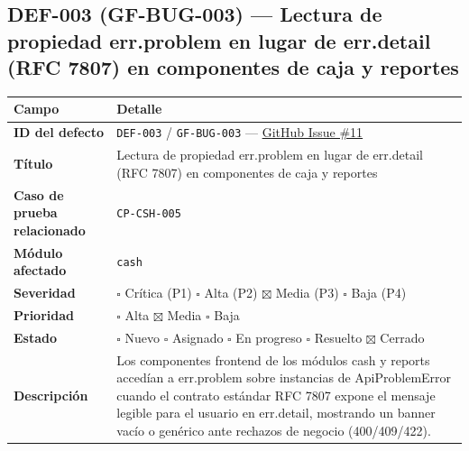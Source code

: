 \documentclass[10pt,a4paper]{article}
\newcounter{none}
\begin{document}
\endgroup\medskip


\subsection{DEF-003 (GF-BUG-003) --- Lectura de propiedad err.problem en lugar de err.detail (RFC 7807) en componentes de caja y reportes}\label{def-003-gf-bug-003--lectura-de-propiedad-errproblem-en-lugar-de-errdetail-rfc-7807-en-componentes-de-caja-y-reportes}

\begingroup\singlespacing\footnotesize\setlength{\parskip}{0pt}

{\def\LTcaptype{none} %
\begin{longtable}[]{@{}
  >{\raggedright\arraybackslash}p{}
  >{\raggedright\arraybackslash}p{}@{}}
\toprule\noalign{}
\begin{minipage}[b]{\linewidth}\raggedright
Campo
\end{minipage} & \begin{minipage}[b]{\linewidth}\raggedright
Detalle
\end{minipage} \\
\midrule\noalign{}
\endhead
\bottomrule\noalign{}
\endlastfoot
\textbf{ID del defecto} & \texttt{DEF-{}\allowbreak{}003} / \texttt{GF-{}\allowbreak{}BUG-{}\allowbreak{}003} --- \href{https://github.com/H3llz07/GastroForge-Testing/issues/11}{GitHub Issue \#11} \\
\textbf{Título} & Lectura de propiedad err.problem en lugar de err.detail (RFC 7807) en componentes de caja y reportes \\
\textbf{Caso de prueba relacionado} & \texttt{CP-{}\allowbreak{}CSH-{}\allowbreak{}005} \\
\textbf{Módulo afectado} & \texttt{cash} \\
\textbf{Severidad} & \ensuremath{\square} Crítica (P1) \ensuremath{\square} Alta (P2) \ensuremath{\boxtimes} Media (P3) \ensuremath{\square} Baja (P4) \\
\textbf{Prioridad} & \ensuremath{\square} Alta \ensuremath{\boxtimes} Media \ensuremath{\square} Baja \\
\textbf{Estado} & \ensuremath{\square} Nuevo \ensuremath{\square} Asignado \ensuremath{\square} En progreso \ensuremath{\square} Resuelto \ensuremath{\boxtimes} Cerrado \\
\textbf{Descripción} & Los componentes frontend de los módulos cash y reports accedían a err.problem sobre instancias de ApiProblemError cuando el contrato estándar RFC 7807 expone el mensaje legible para el usuario en err.detail, mostrando un banner vacío o genérico ante rechazos de negocio (400/409/422). \\

\end{longtable}}
\end{document}
